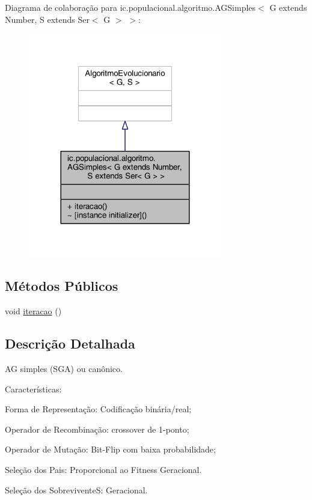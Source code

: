 Diagrama de colaboração para ic.\-populacional.\-algoritmo.\-A\-G\-Simples$<$ G extends Number, S extends Ser$<$ G $>$ $>$\-:\nopagebreak
\begin{figure}[H]
\begin{center}
\leavevmode
\includegraphics[width=240pt]{classic_1_1populacional_1_1algoritmo_1_1_a_g_simples_3_01_g_01extends_01_number_00_01_s_01extendb6fe9b5bad914001c3b9afd3cc12ac23}
\end{center}
\end{figure}
\subsection*{Métodos Públicos}
\begin{DoxyCompactItemize}
\item 
void \hyperlink{classic_1_1populacional_1_1algoritmo_1_1_a_g_simples_3_01_g_01extends_01_number_00_01_s_01extends_01_ser_3_01_g_01_4_01_4_a02714bcbbc9ccb56b22bba689323119b}{iteracao} ()
\end{DoxyCompactItemize}


\subsection{Descrição Detalhada}
A\-G simples (S\-G\-A) ou canônico. 

Características\-: 
\begin{DoxyItemize}
\item Forma de Representação\-: Codificação binária/real; 
\item Operador de Recombinação\-: crossover de 1-\/ponto; 
\item Operador de Mutação\-: Bit-\/\-Flip com baixa probabilidade; 
\item Seleção dos Pais\-: Proporcional ao Fitness Geracional. 
\item Seleção dos Sobrevivente\-S\-: Geracional. 
\end{DoxyItemize}

